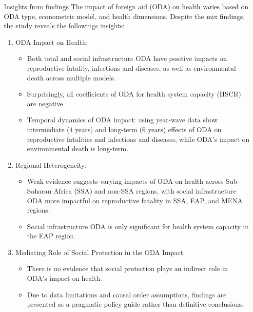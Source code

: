 \documentclass[aspectratio=169,handout, 10pt]{beamer}
\begin{document}
\begin{frame}{Insights from findings}
The impact of foreign aid (ODA) on health varies based on ODA type, econometric model, and health dimensions. Despite the mix findings, the study reveals the followings insights:  
\begin{enumerate}
    \item ODA Impact on Health:
\begin{itemize}
    \item Both total and social infrastructure ODA have positive impacts on reproductive fatality, infections and diseases, as well as environmental death across multiple models.
    \item Surprisingly, all coefficients of ODA for health system capacity (HSCR) are negative.
    \item Temporal dynamics of ODA impact: using year-wave data show intermediate (4 years) and long-term (6 years) effects of ODA on reproductive fatalities and infections and diseases, while ODA's impact on environmental death is long-term.
\end{itemize}
    
    \item Regional Heterogeneity:
\begin{itemize}
    \item Weak evidence suggests varying impacts of ODA on health across Sub-Saharan Africa (SSA) and non-SSA regions, with social infrastructure ODA more impactful on reproductive fatality in SSA, EAP, and MENA regions.
    \item Social infrastructure ODA is only significant for health system capacity in the EAP region.
\end{itemize}
    
    \item Mediating Role of Social Protection in the ODA Impact
    \begin{itemize}
        \item There is no evidence that social protection plays an indirect role in ODA's impact on health.
        \item Due to data limitations and causal order assumptions, findings are presented as a pragmatic policy guide rather than definitive conclusions.
    \end{itemize}
\end{enumerate}    
\end{frame}
\end{document}
